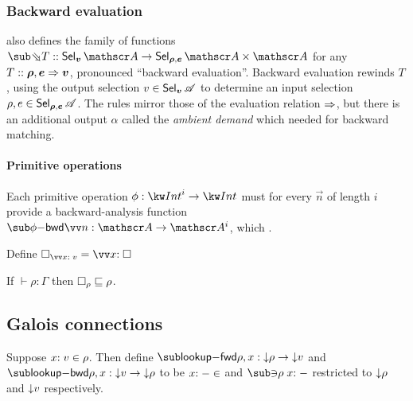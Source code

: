 \subsubsection{Backward evaluation}
\label{sec:data-dependencies:analyses:bwd:eval}

 also defines the family of functions $\evalBwdF{T} :: \Sel{\raw{v}}{A} \to \Sel{\raw{\rho}, \raw{e}}{A} \times \Ann{A}$ for any $T :: \bm{\rho}, \bm{e} \Rightarrow \bm{v}$, pronounced ``backward evaluation''. Backward evaluation rewinds $T$, using the output selection $v \in \textup{\textsf{Sel}}_{\bm{v}}\,{\mathscr{A}}$ to determine an input selection $\rho, e \in \textup{\textsf{Sel}}_{\bm{\rho}, \bm{e}}\,{\mathscr{A}}$. The rules mirror those of the evaluation relation $\Rightarrow$, but there is an additional output $\alpha$ called the \emph{ambient demand} which needed for backward matching.

\paragraph{Primitive operations}

Each primitive operation $\phi: \tyInt^{i} \to \tyInt$ must for every $\vec{n}$ of length $i$ provide a backward-analysis function $\primBwdBool{\phi}{\vec{n}}: \Ann{A} \to \Ann{A}^i$, which .



\begin{definition}
Define $\hole_{\vec{\bind{x}{v}}} = \vec{\bind{x}{\hole}}$
\end{definition}

\begin{lemma}
\label{lem:core-language:hole-env}If $\vdash \rho: \Gamma$ then $\square_{\rho} \sqsubseteq \rho$.
\end{lemma}

\subsection{Galois connections}
\label{sec:data-dependencies:analysis:galois-connections}

\begin{definition}
   Suppose $x{:}\;v\in{\rho}$. Then define $\envLookupFwdF{\rho,x}: \Below{\rho} \to \Below{v}$ and $\envLookupBwdF{\rho,x}: \Below{v} \to \Below{\rho}$ to be $x{:}\;-\in$ and $\envLookupBwdR{\rho}\bind{x}{-}$ restricted to ${\downarrow}{\rho}$ and ${\downarrow}{v}$ respectively.
\end{definition}

